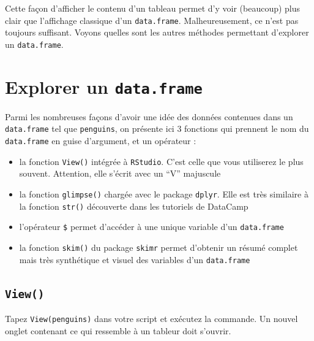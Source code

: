 \documentclass[
  a4paper,
  DIV=11,
  numbers=noendperiod,
  oneside]{scrreprt}
\providecommand{\tightlist}{%
  \setlength{\itemsep}{0pt}\setlength{\parskip}{0pt}}\usepackage{longtable,booktabs,array}
\begin{document}
Cette façon d'afficher le contenu d'un tableau permet d'y voir
(beaucoup) plus clair que l'affichage classique d'un
\texttt{data.frame}. Malheureusement, ce n'est pas toujours suffisant.
Voyons quelles sont les autres méthodes permettant d'explorer un
\texttt{data.frame}.

\section{\texorpdfstring{Explorer un
\texttt{data.frame}}{Explorer un data.frame}}\label{explorer-un-data.frame}

Parmi les nombreuses façons d'avoir une idée des données contenues dans
un \texttt{data.frame} tel que \texttt{penguins}, on présente ici 3
fonctions qui prennent le nom du \texttt{data.frame} en guise
d'argument, et un opérateur :

\begin{itemize}
\tightlist
\item
  la fonction \texttt{View()} intégrée à \texttt{RStudio}. C'est celle
  que vous utiliserez le plus souvent. Attention, elle s'écrit avec un
  ``V'' majuscule
\item
  la fonction \texttt{glimpse()} chargée avec le package \texttt{dplyr}.
  Elle est très similaire à la fonction \texttt{str()} découverte dans
  les tutoriels de DataCamp
\item
  l'opérateur \texttt{\$} permet d'accéder à une unique variable d'un
  \texttt{data.frame}
\item
  la fonction \texttt{skim()} du package \texttt{skimr} permet d'obtenir
  un résumé complet mais très synthétique et visuel des variables d'un
  \texttt{data.frame}
\end{itemize}

\subsection{\texorpdfstring{\texttt{View()}}{View()}}\label{sec-View}

Tapez \texttt{View(penguins)} dans votre script et exécutez la commande.
Un nouvel onglet contenant ce qui ressemble à un tableur doit s'ouvrir.
\end{document}
